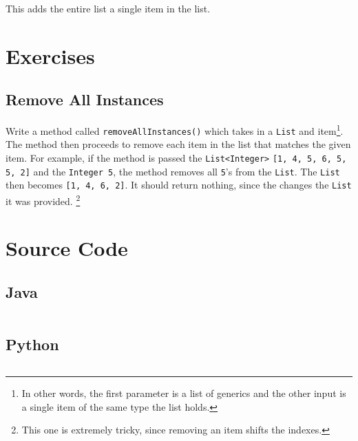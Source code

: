 This adds the entire list a single item in the list.  

\newpage

\section{Exercises}


\subsection{Remove All Instances}
\label{ex-remove-all}
Write a method called \texttt{removeAllInstances()} which takes in a \texttt{List} and item\footnote{In other words, the first parameter is a list of generics and the other input is a single item of the same type the list holds.}.
The method then proceeds to remove each item in the list that matches the given item.
For example, if the method is passed the \texttt{List<Integer>} \texttt{[1, 4, 5, 6, 5, 5, 2]} and the \texttt{Integer }\texttt{5}, the method removes all \texttt{5}'s from the \texttt{List}.
The \texttt{List} then becomes \texttt{[1, 4, 6, 2]}.
It should return nothing, since the changes the \texttt{List} it was provided.
\footnote{This one is extremely tricky, since removing an item shifts the indexes.}
\newpage
\section{Source Code}
\subsection{Java}
\inputminted{Java}{code/MyArrayList.java}
\newpage
\subsection{Python}
\inputminted{Python3}{code/arraylist.py}